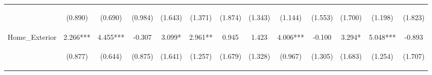 \begin{tabular}{lcccccccccccc}
 & \begin{footnotesize}(0.890)\end{footnotesize} & \begin{footnotesize}(0.690)\end{footnotesize} & \begin{footnotesize}(0.984)\end{footnotesize} & \begin{footnotesize}(1.643)\end{footnotesize} & \begin{footnotesize}(1.371)\end{footnotesize} & \begin{footnotesize}(1.874)\end{footnotesize} & \begin{footnotesize}(1.343)\end{footnotesize} & \begin{footnotesize}(1.144)\end{footnotesize} & \begin{footnotesize}(1.553)\end{footnotesize} & \begin{footnotesize}(1.700)\end{footnotesize} & \begin{footnotesize}(1.198)\end{footnotesize} & \begin{footnotesize}(1.823)\end{footnotesize}\\
\noalign{\smallskip}Home_Exterior & 2.266*** & 4.455*** & -0.307 & 3.099* & 2.961** & 0.945 & 1.423 & 4.006*** & -0.100 & 3.294* & 5.048*** & -0.893\\
 & \begin{footnotesize}(0.877)\end{footnotesize} & \begin{footnotesize}(0.644)\end{footnotesize} & \begin{footnotesize}(0.875)\end{footnotesize} & \begin{footnotesize}(1.641)\end{footnotesize} & \begin{footnotesize}(1.257)\end{footnotesize} & \begin{footnotesize}(1.679)\end{footnotesize} & \begin{footnotesize}(1.328)\end{footnotesize} & \begin{footnotesize}(0.967)\end{footnotesize} & \begin{footnotesize}(1.305)\end{footnotesize} & \begin{footnotesize}(1.683)\end{footnotesize} & \begin{footnotesize}(1.254)\end{footnotesize} & \begin{footnotesize}(1.707)\end{footnotesize}\\

\end{tabular}
